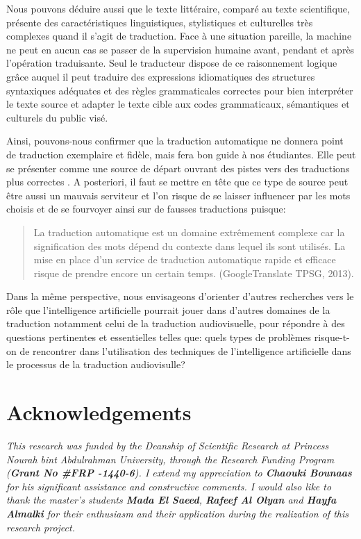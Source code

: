\documentclass{textolivre}
\begin{document}
Nous pouvons déduire aussi que le texte littéraire, comparé au texte scientifique, présente des caractéristiques linguistiques, stylistiques et culturelles très complexes quand il s’agit de traduction. Face à une situation pareille, la machine ne peut en aucun cas se passer de la supervision humaine avant, pendant et après l’opération traduisante. Seul le traducteur dispose de ce raisonnement logique grâce auquel il peut traduire des expressions idiomatiques des structures syntaxiques adéquates et des règles grammaticales correctes pour bien interpréter le texte source et adapter le texte cible aux codes grammaticaux, sémantiques et culturels du public visé.

Ainsi, pouvons-nous confirmer que la traduction automatique ne donnera point de traduction exemplaire et fidèle, mais fera bon guide à nos étudiantes. Elle peut se présenter comme une source de départ ouvrant des pistes vers des traductions plus correctes \cite{gile2005}.  A posteriori, il faut se mettre en tête que ce type de source peut être aussi un mauvais serviteur et l’on risque de se laisser influencer par les mots choisis et de se fourvoyer ainsi sur de fausses traductions \cite[p. 214]{aubin1995} puisque:
 
\begin{quote}La traduction automatique est un domaine extrêmement complexe car la signification des mots dépend du contexte dans lequel ils sont utilisés. La mise en place d’un service de traduction automatique rapide et efficace risque de prendre encore un certain temps. (GoogleTranslate TPSG, 2013).
\end{quote}

Dans la même perspective, nous envisageons d’orienter d’autres recherches vers le rôle que l’intelligence artificielle pourrait jouer dans d’autres domaines de la traduction notamment celui de la traduction audiovisuelle, pour répondre à des questions pertinentes et essentielles telles que: quels types de problèmes risque-t-on de rencontrer dans l’utilisation des techniques de l’intelligence artificielle dans le processus de la traduction audiovisulle?

\section{Acknowledgements}\label{sec-agradecimentos}
\begin{english}
\textit{
This research was funded by the Deanship of Scientific Research at Princess Nourah bint Abdulrahman University, through the Research Funding Program (\textbf{Grant No \#FRP -1440-6}).
I extend my appreciation to \textbf{Chaouki Bounaas} for his significant assistance and constructive comments. I would also like to thank the master's students \textbf{Mada El Saeed}, \textbf{Rafeef Al Olyan} and \textbf{Hayfa Almalki} for their enthusiasm and their application during the realization of this research project.
}
\end{english}

\printbibliography\label{sec-bib}
\end{document}

